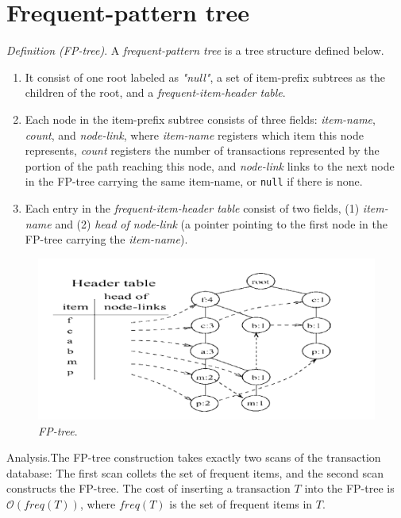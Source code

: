 \documentclass[12pt, a4paper]{article}
\newcommand{\code}[1]{\texttt{#1}}
\begin{document}
\section{Frequent-pattern tree}

\textit{Definition (FP-tree)}. A \textit{frequent-pattern tree} is a tree structure defined below.

\begin{enumerate}
  \item It consist of one root labeled as \textit{"null"}, a set of item-prefix subtrees as the children of the root, and a \textit{frequent-item-header table}.
  \item Each node in the item-prefix subtree consists of three fields: \textit{item-name}, \textit{count}, and \textit{node-link}, where \textit{item-name} registers which item this node represents, \textit{count} registers the number of transactions represented by the portion of the path reaching this node, and \textit{node-link} links to the next node in the FP-tree carrying the same item-name, or \code{null} if there is none.
  \item Each entry in the \textit{frequent-item-header table} consist of two fields, (1) \textit{item-name} and (2) \textit{head of node-link} (a pointer pointing to the first node in the FP-tree carrying the \textit{item-name}).
\end{enumerate}

\begin{figure}[b]
  \includegraphics[scale=0.5]{fp-tree}
  \centering
  \caption{\textit{FP-tree}.}
  \label{fig:rbt}
\end{figure}

Analysis.\quad The FP-tree construction takes exactly two scans of the transaction database: The first scan collets the set of frequent items, and the second scan constructs the FP-tree. The cost of inserting a transaction $T$ into the FP-tree is $\mathcal{O}(freq(T))$, where $freq(T)$ is the set of frequent items in $T$.
\end{document}
